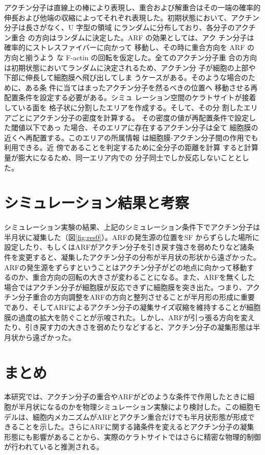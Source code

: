 \documentclass[10pt,twocolumn,a4j]{jarticle}
\begin{document}
アクチン分子は直線上の棒により表現し、重合および解重合はその一端の確率的伸長゙および他端の収縮によってそれぞれ表現した。初期状態において、アクチン分子は長さがなく、U 字型の領域 にランダムに分布しており、各分子のアクチン重合 の方向はランダムに決定した。ARF の効果としては、アク チン分子は確率的にストレスファイバーに向かって 移動し、その時に重合方向を ARF の方向と揃うよう な F-actin の回転を仮定した。全てのアクチン分子重 合の方向は初期状態においてランダムに決定されるため、アクチン分 子が細胞の上部や下部に伸長して細胞膜へ飛び出してしま うケースがある。そのような場合のために、ある条 件に当てはまったアクチン分子を然るべきの位置へ 移動させる再配置条件を設定する必要がある。シミュ レーション空間のケラトサイトが接着している面を 格子状に分割したエリアを作成する。そして、その分 割したエリアごとにアクチン分子の密度を計算する。 その密度の値が再配置条件で設定した閾値以下であっ た場合、そのエリアに存在するアクチン分子は全て 細胞膜の近くへ再配置する。このエリアの所属情報 は細胞膜-アクチン分子間の作用でも利用できる。近 傍であることを判定するために全分子の距離を計算 すると計算量が膨大になるため、同一エリア内での 分子同士でしか反応しないこととした。
\section{シミュレーション結果と考察}
シミュレーション実験の結果、上記のシミュレーション条件下でアクチン分子は半月状に凝集した（図\ref{fig:res0}）。ARFの発生源の位置をSF からずらした場所に設定したり、もしくはARFがアクチン分子を引き戻す強さを弱めたりなど諸条件を変更すると、凝集したアクチン分子の分布が半月状の形状から遠ざかった。ARFの発生源をずらすということはアクチン分子がどの地点に向かって移動するのか、重合方向の回転の大きさが変わることになる。また、ARFを無くした場合ではアクチン分子が細胞膜が反応できずに細胞膜を突き出た。つまり、アクチン分子重合の方向調整をARFの方向と整列させることが半月形の形成に重要であり、そしてARFによるアクチン分子の凝集サイズ収縮を維持することが細胞膜の過度の拡大を防ぐことが示唆された。しかし、ARFが引っ張る方向を変えたり、引き戻す力の大きさを弱めたりなどすると、アクチン分子の凝集形態は半月状から遠ざかった。
\section{まとめ}
本研究では、アクチン分子の重合やARFがどのような条件で作用したときに細胞が半月状になるのかを物理シミュレーション実験により検討した。この細胞モデルは、細胞内メカニズムがARFとアクチン重合だけでも半月状形態が形成できることを示した。さらにARFに関する諸条件を変えるとアクチン分子の凝集形態にも影響があることから、実際のケラトサイトではさらに精密な物理的制御が行われていると推測される。
\end{document}
